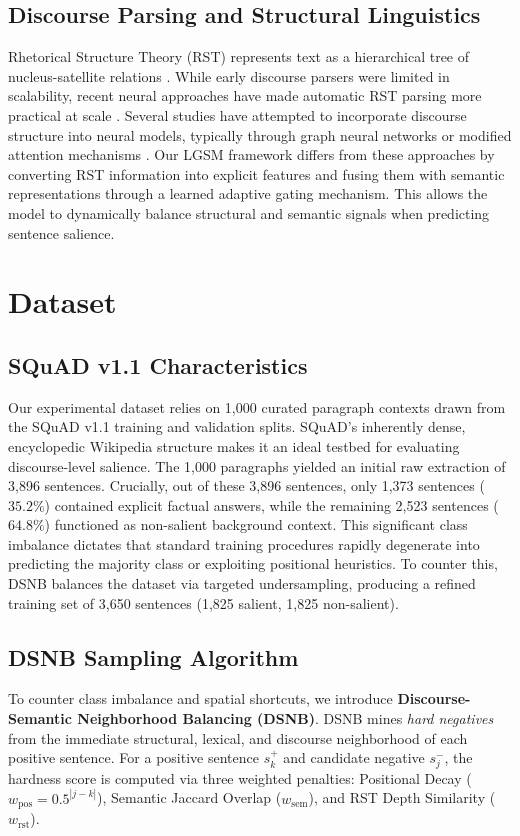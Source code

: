 \documentclass[11pt,a4paper,twocolumn]{article}
\begin{document}
\subsection{Discourse Parsing and Structural Linguistics}
Rhetorical Structure Theory (RST) represents text as a hierarchical tree of nucleus-satellite relations \cite{mann1988rhetorical}. While early discourse parsers were limited in scalability, recent neural approaches have made automatic RST parsing more practical at scale \cite{ji-eisenstein-2014-representation, liu-etal-2020-multilingual}. Several studies have attempted to incorporate discourse structure into neural models, typically through graph neural networks or modified attention mechanisms \cite{xiao-etal-2021-predicting, huber-carenini-2020-mega}.
Our LGSM framework differs from these approaches by converting RST information into explicit features and fusing them with semantic representations through a learned adaptive gating mechanism. This allows the model to dynamically balance structural and semantic signals when predicting sentence salience.

\section{Dataset}

\subsection{SQuAD v1.1 Characteristics}
Our experimental dataset relies on 1,000 curated paragraph contexts drawn from the SQuAD v1.1 training and validation splits. SQuAD's inherently dense, encyclopedic Wikipedia structure makes it an ideal testbed for evaluating discourse-level salience. The 1,000 paragraphs yielded an initial raw extraction of 3,896 sentences. Crucially, out of these 3,896 sentences, only 1,373 sentences ($35.2\%$) contained explicit factual answers, while the remaining 2,523 sentences ($64.8\%$) functioned as non-salient background context. This significant class imbalance dictates that standard training procedures rapidly degenerate into predicting the majority class or exploiting positional heuristics. To counter this, DSNB balances the dataset via targeted undersampling, producing a refined training set of 3,650 sentences (1,825 salient, 1,825 non-salient).

\subsection{DSNB Sampling Algorithm}
To counter class imbalance and spatial shortcuts, we introduce \textbf{Discourse-Semantic Neighborhood Balancing (DSNB)}. DSNB mines \textit{hard negatives} from the immediate structural, lexical, and discourse neighborhood of each positive sentence. For a positive sentence $s_k^+$ and candidate negative $s_j^-$, the hardness score is computed via three weighted penalties: Positional Decay ($w_{\text{pos}} = 0.5^{|j - k|}$), Semantic Jaccard Overlap ($w_{\text{sem}}$), and RST Depth Similarity ($w_{\text{rst}}$).
\end{document}
